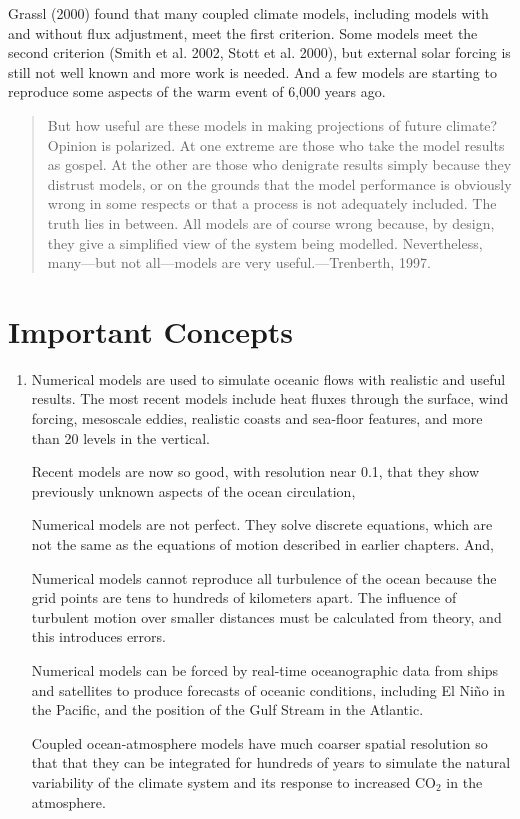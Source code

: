 Grassl (2000) found that many coupled climate models, including models
with and without flux adjustment, meet the first criterion. Some models meet the
second criterion (Smith et al. 2002, Stott et al. 2000), but external
solar forcing is still not well known and more work is needed. And a
few models are starting to reproduce some aspects of the warm event of
6,000 years ago.
\begin{quote} \small
But how useful are these models in making projections of future
climate? Opinion is polarized. At one extreme are those who take the
model results as gospel. At the other are those who denigrate results
simply because they distrust models, or on the grounds that the model
performance is obviously wrong in some respects or that a process is
not adequately included. The truth lies in between. All models are of
course wrong because, by design, they give a simplified view of the
system being modelled. Nevertheless, many---but not all---models are
very useful.---Trenberth, 1997.
\end{quote}

\section{Important Concepts}
\begin{enumerate}
\item Numerical models are used to simulate oceanic flows with
realistic and useful results. The most recent models include heat
fluxes through the surface, wind forcing, mesoscale
eddies, realistic coasts and sea-floor
features, and more than 20 levels in the vertical.

\vitem Recent models are now so good, with resolution near
0.1\degrees, that they show previously unknown aspects of the ocean
circulation,

\vitem Numerical models are not perfect. They solve discrete
equations, which are not the same as the equations of motion described
in earlier chapters. And,

\vitem Numerical models cannot reproduce all
turbulence of the ocean because the grid
points are tens to hundreds of kilometers apart. The influence of
turbulent motion over smaller distances must be calculated from
theory, and this introduces errors.

\vitem Numerical models can be forced by real-time oceanographic data
from ships and satellites to produce forecasts of oceanic conditions,
including El Ni\~{n}o in the Pacific, and the position of the Gulf
Stream in the Atlantic.

\vitem Coupled ocean-atmosphere models have much coarser spatial
resolution so that that they can be integrated for hundreds of years
to simulate the natural variability of the climate system and its
response to increased CO$_2$ in the atmosphere.
\end{enumerate}


